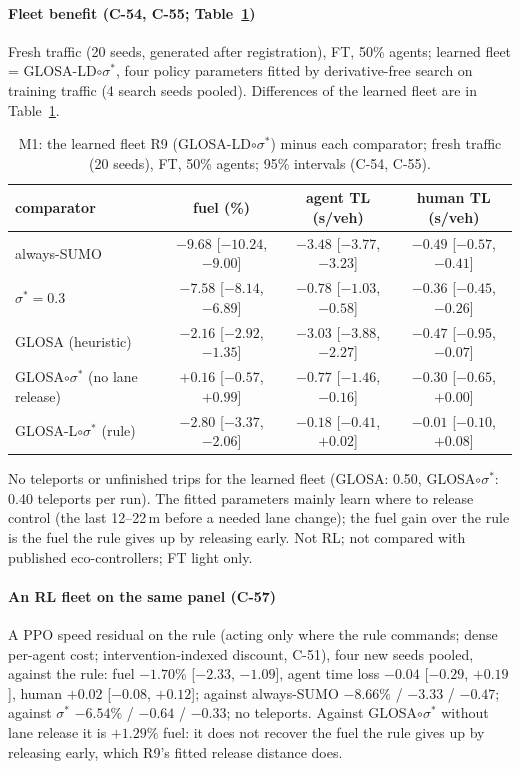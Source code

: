 \paragraph{Fleet benefit (C-54, C-55; Table~\ref{tab:m1})} Fresh traffic (20 seeds, generated after registration), FT, 50\% agents; learned
fleet = GLOSA-LD$\circ\sigma^*$, four policy parameters fitted by derivative-free search on training traffic (4 search seeds pooled).
Differences of the learned fleet are in Table~\ref{tab:m1}.
\begin{table}[t]\centering\small
\caption{M1: the learned fleet R9 (GLOSA-LD$\circ\sigma^*$) minus each comparator; fresh traffic (20 seeds), FT, 50\% agents; 95\%
intervals (C-54, C-55).}\label{tab:m1}
\begin{tabular}{lccc}\toprule
comparator & fuel (\%) & agent TL (s/veh) & human TL (s/veh)\\\midrule
always-SUMO & $-9.68$ [$-10.24$, $-9.00$] & $-3.48$ [$-3.77$, $-3.23$] & $-0.49$ [$-0.57$, $-0.41$]\\
$\sigma^*=0.3$ & $-7.58$ [$-8.14$, $-6.89$] & $-0.78$ [$-1.03$, $-0.58$] & $-0.36$ [$-0.45$, $-0.26$]\\
GLOSA (heuristic) & $-2.16$ [$-2.92$, $-1.35$] & $-3.03$ [$-3.88$, $-2.27$] & $-0.47$ [$-0.95$, $-0.07$]\\
GLOSA$\circ\sigma^*$ (no lane release) & $+0.16$ [$-0.57$, $+0.99$] & $-0.77$ [$-1.46$, $-0.16$] & $-0.30$ [$-0.65$, $+0.00$]\\
GLOSA-L$\circ\sigma^*$ (rule) & $-2.80$ [$-3.37$, $-2.06$] & $-0.18$ [$-0.41$, $+0.02$] & $-0.01$ [$-0.10$, $+0.08$]\\\bottomrule
\end{tabular}\end{table}
No teleports or unfinished trips for the learned fleet (GLOSA: 0.50, GLOSA$\circ\sigma^*$: 0.40 teleports per run). The fitted
parameters mainly learn where to release control (the last 12--22\,m before a needed lane change); the fuel gain over the rule is the
fuel the rule gives up by releasing early. Not RL; not compared with published eco-controllers; FT light only.
\paragraph{An RL fleet on the same panel (C-57)} A PPO speed residual on the rule (acting only where the rule commands; dense per-agent
cost; intervention-indexed discount, C-51), four new seeds pooled, against the rule: fuel $-1.70\%$ [$-2.33$, $-1.09$], agent time loss
$-0.04$ [$-0.29$, $+0.19$], human $+0.02$ [$-0.08$, $+0.12$]; against always-SUMO $-8.66\%$ / $-3.33$ / $-0.47$; against $\sigma^*$
$-6.54\%$ / $-0.64$ / $-0.33$; no teleports. Against GLOSA$\circ\sigma^*$ without lane release it is $+1.29\%$ fuel: it does not recover the fuel the
rule gives up by releasing early, which R9's fitted release distance does.
